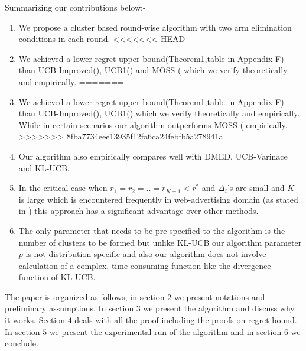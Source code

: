 	Summarizing our contributions below:-
\begin{enumerate}
\item We propose a cluster based round-wise algorithm with two arm elimination conditions in each round.
<<<<<<< HEAD
\item We achieved a lower regret upper bound(Theorem1,table in Appendix F) than UCB-Improved(\cite{auer2010ucb}), UCB1(\cite{auer2002finite}) and  MOSS (\cite{audibert2009minimax} which we verify theoretically and empirically.
=======
\item We achieved a lower regret upper bound(Theorem1,table in Appendix F) than UCB-Improved(\cite{auer2010ucb}), UCB1(\cite{auer2002finite}) which we verify theoretically and empirically. While in certain scenarios our algorithm outperforms MOSS (\cite{audibert2009minimax} empirically.
>>>>>>> 8fba7734eee13935f12fa6ca24febfb5a278941a
\item Our algorithm also empirically compares well with DMED, UCB-Varinace and KL-UCB.
\item In the critical case when $r_{1}=r_{2}=..=r_{K-1}<r^{*}$ and $\Delta_{i}$'s are small and $K$ is large which is encountered frequently in web-advertising domain (as stated in \cite{garivier2011kl}) this approach has a significant advantage over other methods.
\item The only parameter that needs to be pre-specified to the algorithm is the number of clusters to be formed but unlike KL-UCB our algorithm parameter $p$ is not distribution-specific and also our algorithm does not involve calculation of a complex, time consuming function like the divergence function of KL-UCB.
\end{enumerate}
	
	The paper is organized as follows, in section $2$ we present notations and preliminary assumptions. In section $3$ we present the algorithm and discuss why it works. Section $4$ deals with all the proof including the proofs on regret bound. In section $5$ we present the experimental run of the algorithm and in section $6$ we conclude. 
